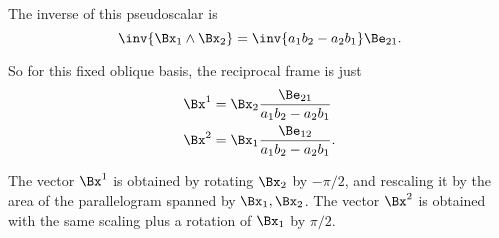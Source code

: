The inverse of this pseudoscalar is
\begin{equation}\label{eqn:reciprocal_R2:280}
\inv{\Bx_1 \wedge \Bx_2 }
=
\inv{ a_1 b_2 - a_2 b_1 } \Be_{21}.
\end{equation}

So for this fixed oblique  basis, the reciprocal frame is just
\begin{equation}\label{eqn:reciprocal_R2:300}
\begin{aligned}
\Bx^1 &= \Bx_2 \frac{\Be_{21}}{ a_1 b_2 - a_2 b_1 } \\
\Bx^2 &= \Bx_1 \frac{\Be_{12}}{ a_1 b_2 - a_2 b_1 }.
\end{aligned}
\end{equation}

The vector \( \Bx^1 \) is obtained by rotating \( \Bx_2 \) by \( -\pi/2 \), and rescaling it by the area of the parallelogram spanned by \( \Bx_1, \Bx_2 \).
The vector \( \Bx^2 \) is obtained with the same scaling plus a rotation of \( \Bx_1 \) by \( \pi/2 \).

